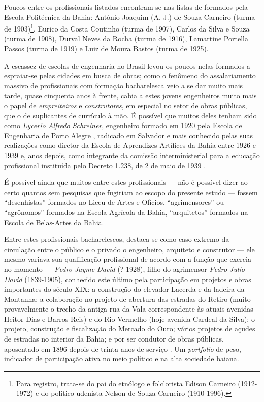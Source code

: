 Poucos entre os profissionais listados encontram-se nas listas de formados pela Escola Politécnica da Bahia: Antônio Joaquim (A. J.) de Souza Carneiro (turma de 1903)\footnote{Para registro, trata-se do pai do etnólogo e folclorista Edison Carneiro (1912-1972) e do político udenista Nelson de Souza Carneiro (1910-1996).}, Eurico da Costa Coutinho (turma de 1907), Carlos da Silva e Souza (turma de 1908), Durval Neves da Rocha (turma de 1916), Lamartine Portella Passos (turma de 1919) e Luiz de Moura Bastos (turma de 1925). 

A escassez de escolas de engenharia no Brasil levou os poucos nelas formados a espraiar-se pelas cidades em busca de obras; como o fenômeno do assalariamento massivo de profissionais com formação bacharelesca veio a se dar muito mais tarde, quase cinquenta anos à frente, cabia a estes jovens engenheiros muito mais o papel de \textit{empreiteiros} e \textit{construtores}, em especial no setor de obras públicas, que o de suplicantes de currículo à mão. É possível que muitos deles tenham sido como \textit{Lycerio Alfredo Schreiner}, engenheiro formado em 1920 pela Escola de Engenharia de Porto Alegre \cite{lersch_engenhariapoa_2014}, radicado em Salvador e mais conhecido pelas suas realizações como diretor da Escola de Aprendizes Artífices da Bahia entre 1926 e 1939 \cite{moreira_escolaartifices_2009} e, anos depois, como integrante da comissão interministerial para a educação profissional instituída pelo Decreto 1.238, de 2 de maio de 1939 \cite[p.~184]{almeida_ensinoindustrial_2010}. 

É possível ainda que muitos entre estes profissionais --- não é possível dizer ao certo quantos sem pesquisas que fugiriam ao escopo do presente estudo --- fossem ``desenhistas'' formados no Liceu de Artes e Ofícios, ``agrimensores'' ou  ``agrônomos'' formados na Escola Agrícola da Bahia, ``arquitetos'' formados na Escola de Belas-Artes da Bahia. 

Entre estes profissionais bacharelescos, destaca-se como caso extremo da circulação entre o público e o privado o engenheiro, arquiteto e construtor --- ele mesmo variava sua qualificação profissional de acordo com a função que exercia no momento --- \textit{Pedro Jayme David} (?-1928), filho do agrimensor \textit{Pedro Julio David} (1839-1905), conhecido este último pela participação em projetos e obras importantes do século XIX: a construção do elevador Lacerda e da ladeira da Montanha; a colaboração no projeto de abertura das estradas do Retiro (muito provavelmente o trecho da antiga rua da Vala correspondente às atuais avenidas Heitor Dias e Barros Reis) e do Rio Vermelho (hoje avenida Cardeal da Silva); o projeto, construção e fiscalização do Mercado do Ouro; vários projetos de açudes de estradas no interior da Bahia; e por ser condutor de obras públicas, aposentado em 1896 depois de trinta anos de serviço \cite[pp.~327-328]{querino_artistas_2018}. Um \textit{portfolio} de peso, indicador de participação ativa no meio político e na alta sociedade baiana.

